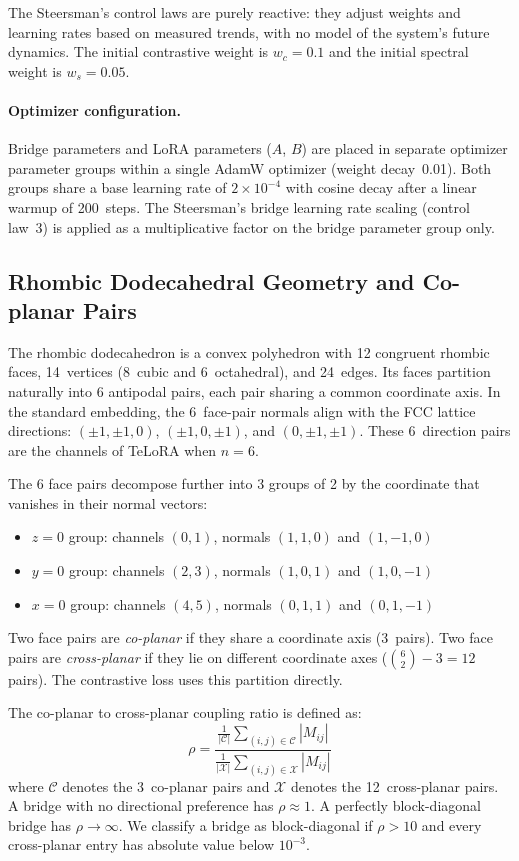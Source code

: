 \documentclass[11pt]{article}
\begin{document}
The Steersman's control laws are purely reactive: they adjust weights
and learning rates based on measured trends, with no model of the
system's future dynamics. The initial contrastive weight is
$w_c = 0.1$ and the initial spectral weight is $w_s = 0.05$.

\paragraph{Optimizer configuration.}
Bridge parameters and LoRA parameters ($A$, $B$) are placed in
separate optimizer parameter groups within a single AdamW optimizer
(weight decay~0.01). Both groups share a base learning rate of
$2 \times 10^{-4}$ with cosine decay after a linear warmup of
200~steps. The Steersman's bridge learning rate scaling (control
law~3) is applied as a multiplicative factor on the bridge parameter
group only.

\subsection{Rhombic Dodecahedral Geometry and Co-planar Pairs}
\label{sec:rdgeometry}

The rhombic dodecahedron is a convex polyhedron with 12 congruent
rhombic faces, 14~vertices (8~cubic and 6~octahedral), and 24~edges.
Its faces partition naturally into 6 antipodal pairs, each pair
sharing a common coordinate axis. In the standard embedding, the
6~face-pair normals align with the FCC lattice directions:
$(\pm 1, \pm 1, 0)$, $(\pm 1, 0, \pm 1)$, and
$(0, \pm 1, \pm 1)$. These 6~direction pairs are the channels of
TeLoRA when $n = 6$.

The 6 face pairs decompose further into 3 groups of 2 by the
coordinate that vanishes in their normal vectors:
%
\begin{itemize}
  \item $z{=}0$ group: channels $(0, 1)$, normals $(1,1,0)$ and $(1,-1,0)$
  \item $y{=}0$ group: channels $(2, 3)$, normals $(1,0,1)$ and $(1,0,-1)$
  \item $x{=}0$ group: channels $(4, 5)$, normals $(0,1,1)$ and $(0,1,-1)$
\end{itemize}
%
Two face pairs are \emph{co-planar} if they share a coordinate axis
(3~pairs). Two face pairs are \emph{cross-planar} if they lie on
different coordinate axes ($\binom{6}{2} - 3 = 12$ pairs). The
contrastive loss uses this partition directly.

The co-planar to cross-planar coupling ratio is defined as:
%
\begin{equation}
  \rho = \frac{
    \frac{1}{|\mathcal{C}|}\sum_{(i,j) \in \mathcal{C}} |M_{ij}|
  }{
    \frac{1}{|\mathcal{X}|}\sum_{(i,j) \in \mathcal{X}} |M_{ij}|
  }
  \label{eq:rho}
\end{equation}
%
where $\mathcal{C}$ denotes the 3~co-planar pairs and $\mathcal{X}$
denotes the 12~cross-planar pairs. A bridge with no directional
preference has $\rho \approx 1$. A perfectly block-diagonal bridge has
$\rho \to \infty$. We classify a bridge as block-diagonal if
$\rho > 10$ and every cross-planar entry has absolute value below
$10^{-3}$.
\end{document}
